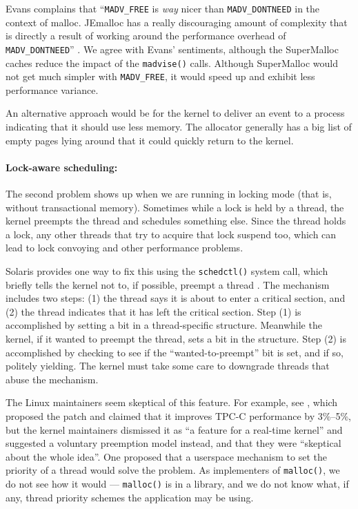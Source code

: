 \documentclass[pldi]{sigplanconf-pldi15}
\newcommand{\code}[1]{\texttt{#1}}
\begin{document}
Evans complains that ``\code{MADV_FREE} is \textit{way} nicer than
\code{MADV_DONTNEED} in the context of malloc.  JEmalloc has a really
discouraging amount of complexity that is directly a result of working
around the performance overhead of \code{MADV_DONTNEED}''
\cite{Evans12}.  We agree with Evans' sentiments, although the
SuperMalloc caches reduce the impact of the \code{madvise()} calls.
Although SuperMalloc would not get much simpler with \code{MADV_FREE},
it would speed up and exhibit less performance variance.

An alternative approach would be for the kernel to deliver an event to
a process indicating that it should use less memory.  The allocator
generally has a big list of empty pages lying around that it could
quickly return to the kernel.

{\paragraph{Lock-aware scheduling:}} The second problem shows up when
we are running in locking mode (that is, without transactional
memory).  Sometimes while a lock is held by a thread, the kernel
preempts the thread and schedules something else.  Since the thread
holds a lock, any other threads that try to acquire that lock suspend
too, which can lead to lock convoying and other performance problems.

Solaris provides one way to fix this using the \code{schedctl()}
system call, which briefly tells the kernel not to, if possible,
preempt a thread \cite{Dice11}.  The mechanism includes two steps: (1)
the thread says it is about to enter a critical section, and (2) the
thread indicates that it has left the critical section.  Step (1) is
accomplished by setting a bit in a thread-specific structure.
Meanwhile the kernel, if it wanted to preempt the thread, sets a bit
in the structure.  Step (2) is accomplished by checking to see if the
``wanted-to-preempt'' bit is set, and if so, politely yielding.  The
kernel must take some care to downgrade threads that abuse the
mechanism.

The Linux maintainers seem skeptical of this feature.  For example,
see \cite{Aziz14}, which proposed the patch and claimed that it
improves TPC-C performance by 3\%--5\%, but the kernel maintainers
dismissed it as ``a feature for a real-time kernel'' and suggested a
voluntary preemption model instead, and that they were ``skeptical
about the whole idea''.  One proposed \cite{Oboguev14a, Oboguev14b}
that a userspace mechanism to set the priority of a thread would solve
the problem.  As implementers of \code{malloc()}, we do not see how it
would --- \code{malloc()} is in a library, and we do not know what, if
any, thread priority schemes the application may be using.
\end{document}

